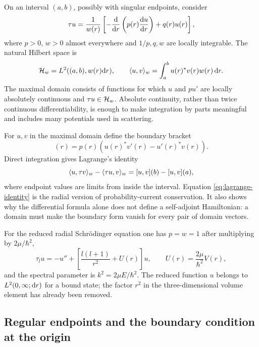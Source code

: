 On an interval $(a,b)$, possibly with singular endpoints, consider
\begin{equation}
  \tau u
  =\frac{1}{w(r)}
  \left[-\frac{\mathrm{d}}{\mathrm{d} r}
  \left(p(r)\frac{\mathrm{d} u}{\mathrm{d} r}\right)+q(r)u(r)\right],
  \label{eq:sturm-liouville-expression}
\end{equation}
where $p>0$, $w>0$ almost everywhere and
$1/p,q,w$ are locally integrable.  The natural Hilbert space is
\begin{equation}
  \mathcal{H}_w=L^2((a,b),w(r)\mathrm{d} r),
  \qquad
  \langle u,v\rangle_w
  =\int_a^b u(r)^*v(r)w(r)\,\mathrm{d} r.
  \label{eq:sl-weighted-space}
\end{equation}
The maximal domain consists of functions for which $u$ and $pu'$ are locally
absolutely continuous and $\tau u\in\mathcal{H}_w$.  Absolute continuity, rather
than twice continuous differentiability, is enough to make integration by
parts meaningful and includes many potentials used in scattering.

For $u,v$ in the maximal domain define the boundary bracket
\begin{equation}
  [u,v](r)
  =p(r)\left(u(r)^*v'(r)-u'(r)^*v(r)\right).
  \label{eq:sl-boundary-bracket}
\end{equation}
Direct integration gives Lagrange's identity
\begin{equation}
  \langle u,\tau v\rangle_w
  -\langle \tau u,v\rangle_w
  =[u,v](b)-[u,v](a),
  \label{eq:lagrange-identity}
\end{equation}
where endpoint values are limits from inside the interval.  Equation
\eqref{eq:lagrange-identity} is the radial version of probability-current
conservation.  It also shows why the differential formula alone does not
define a self-adjoint Hamiltonian: a domain must make the boundary form
vanish for every pair of domain vectors.

For the reduced radial Schr\"odinger equation one has $p=w=1$ after
multiplying by $2\mu/\hbar^2$,
\begin{equation}
  \tau_l u
  =-u''+\left[\frac{l(l+1)}{r^2}+U(r)\right]u,
  \qquad
  U(r)=\frac{2\mu}{\hbar^2}V(r),
  \label{eq:sl-radial-expression}
\end{equation}
and the spectral parameter is $k^2=2\mu E/\hbar^2$.  The reduced function
$u$ belongs to $L^2(0,\infty;\mathrm{d} r)$ for a bound state; the factor $r^2$ in
the three-dimensional volume element has already been removed.

\subsection{Regular endpoints and the boundary condition at the origin}
\label{subsec:sl-regular-endpoint}

